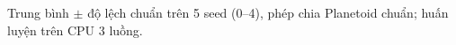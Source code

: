 Trung bình $\pm$ độ lệch chuẩn trên 5 seed (0–4), phép chia Planetoid chuẩn; huấn luyện trên CPU 3 luồng.
